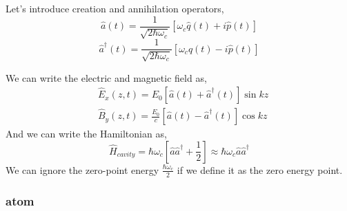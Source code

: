 \documentclass[english, a4paper, 12pt, twoside]{article}
\numberwithin{equation}{section} %
\begin{document}
Let’s introduce creation and annihilation operators,
$$\hat{a}(t) = \frac{1}{\sqrt{2\hbar\omega_c}}[\omega_c\hat{q}(t) + i\hat{p}(t)]$$
$$\hat{a}^\dag(t) = \frac{1}{\sqrt{2\hbar\omega_c}}[\omega_c\hat{q}(t) - i\hat{p}(t)]$$

We can write the electric and magnetic field as,
\begin{align}
         &\hat{E}_x(   z, t) = E_0[\hat{a}(t) + \hat{a}^\dag(t)]\sin{kz} \\
         &\hat{B}_y(z, t) = \frac{E_0}{c}[\hat{a}(t) - \hat{a}^\dag(t)]\cos{kz}
\end{align}
And we can write the Hamiltonian as,
\begin{equation}
    \boxed{\hat{H}_{cavity} = \hbar\omega_c[\hat{a}\hat{a}^\dag + \frac{1}{2}] \approx \hbar\omega_c\hat{a}\hat{a}^\dag}
\end{equation}
We can ignore the zero-point energy $\frac{\hbar\omega_c}{2}$ if we define it as the zero energy point.

\subsubsection{atom}
\end{document}
